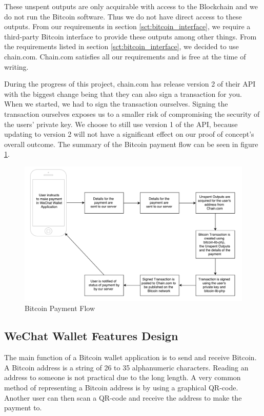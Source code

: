 These unspent outputs are only acquirable with access to the Blockchain and we do not run the Bitcoin software. Thus we do not have direct access to these outputs. From our requirements in section \ref{sct:bitcoin_interface}, we require a third-party Bitcoin interface to provide these outputs among other things. From the requirements listed in section \ref{sct:bitcoin_interface}, we decided to use chain.com. Chain.com satisfies all our requirements and is free at the time of writing. 

During the progress of this project, chain.com has release version 2 of their API with the biggest change being that they can also sign a transaction for you. When we started, we had to sign the transaction ourselves. Signing the transaction ourselves exposes us to a smaller risk of compromising the security of the users' private key. We choose to still use version 1 of the API, because updating to version 2 will not have a significant effect on our proof of concept's overall outcome. The summary of the Bitcoin payment flow can be seen in figure \ref{fig:bitcoin_payment_flow}.

\begin{figure}
  \centering
    \includegraphics[width=\textwidth]{figs/Bitcoin_payment_flow.pdf}
   \caption{Bitcoin Payment Flow} 
   \label{fig:bitcoin_payment_flow}
\end{figure}

\subsection{WeChat Wallet Features Design}

The main function of a Bitcoin wallet application is to send and receive Bitcoin. A Bitcoin address is a string of 26 to 35 alphanumeric characters. Reading an address to someone is not practical due to the long length. A very common method of representing a Bitcoin address is by using a graphical QR-code. Another user can then scan a QR-code and receive the address to make the payment to.


